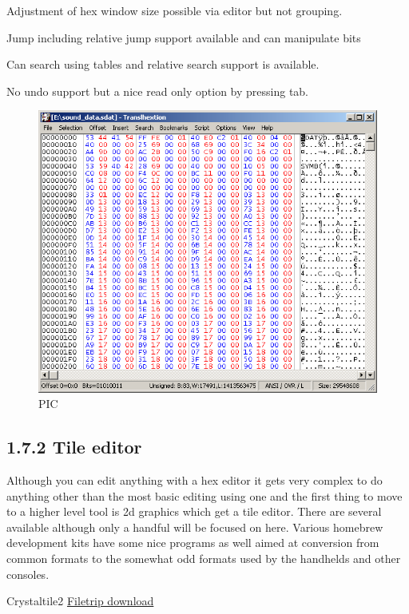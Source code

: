 \documentclass[
]{book}
\begin{document}
Adjustment of hex window size possible via editor but not grouping.

Jump including relative jump support available and can manipulate bits

Can search using tables and relative search support is available.

No undo support but a nice read only option by pressing tab.

\begin{figure}
\centering
\includegraphics{images/11_home_fast6191_romhackingguide_unrenamed_file___ackingguidehexeditorsshowcasetranslhextion1.png}
\caption{PIC}
\end{figure}

\hypertarget{tile-editor}{%
\subsection{1.7.2 Tile editor}\label{tile-editor}}

Although you can edit anything with a hex editor it gets very complex to do anything other than the most basic editing using one and the first thing to move to a higher level tool is 2d graphics which get a tile editor. There are several available although only a handful will be focused on here. Various homebrew development kits have some nice programs as well aimed at conversion from common formats to the somewhat odd formats used by the handhelds and other consoles.

Crystaltile2 \href{http://filetrip.net/f23649-CrystalTile2-2010-09-06.html}{Filetrip download}
\end{document}
